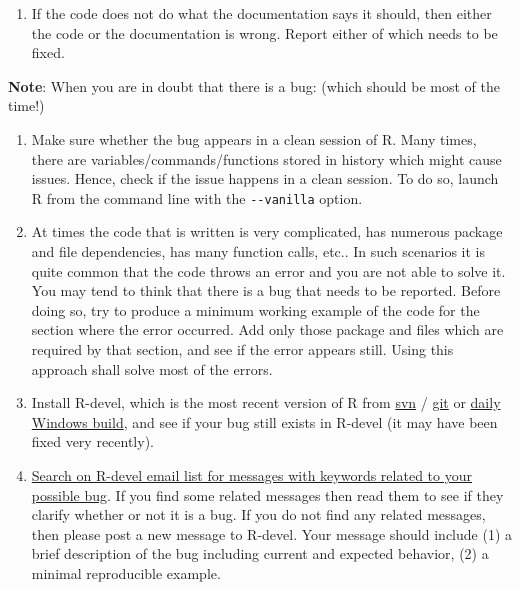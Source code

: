 \documentclass[
]{book}
\providecommand{\tightlist}{%
  \setlength{\itemsep}{0pt}\setlength{\parskip}{0pt}}
\begin{document}
\begin{enumerate}
\def\labelenumi{\arabic{enumi}.}
\setcounter{enumi}{1}
\tightlist
\item
  If the code does not do what the documentation says it should, then either the code or the documentation is wrong. Report either of which needs to be fixed.
\end{enumerate}

\textbf{Note}:
When you are in doubt that there is a bug: (which should be most of the time!)

\begin{enumerate}
\def\labelenumi{\arabic{enumi}.}
\item
  Make sure whether the bug appears in a clean session of R. Many times, there are variables/commands/functions stored in history which might cause issues. Hence, check if the issue happens in a clean session. To do so, launch R from the command line with the \texttt{-\/-vanilla} option.
\item
  At times the code that is written is very complicated, has numerous package and file dependencies, has many function calls, etc.. In such scenarios it is quite common that the code throws an error and you are not able to solve it. You may tend to think that there is a bug that needs to be reported. Before doing so, try to produce a minimum working example of the code for the section where the error occurred. Add only those package and files which are required by that section, and see if the error appears still. Using this approach shall solve most of the errors.
\item
  Install R-devel, which is the most recent version of R from \href{https://svn.r-project.org/R/trunk/}{svn} / \href{https://github.com/r-devel/r-svn}{git} or \href{https://cran.r-project.org/bin/windows/base/rdevel.html}{daily Windows build}, and see if your bug still exists in R-devel (it may have been fixed very recently).
\item
  \href{https://r.789695.n4.nabble.com/template/NamlServlet.jtp?macro=search_page\&node=909078\&query=isna\&days=0}{Search on R-devel email list for messages with keywords related to your possible bug}. If you find some related messages then read them to see if they clarify whether or not it is a bug. If you do not find any related messages, then please post a new message to R-devel. Your message should include (1) a brief description of the bug including current and expected behavior, (2) a minimal reproducible example.
\end{enumerate}
\end{document}
